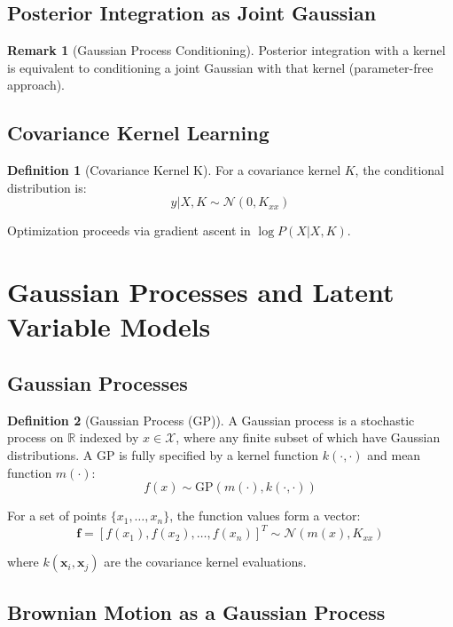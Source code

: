 \documentclass[12pt,a4paper]{article}
\theoremstyle{definition}
\newtheorem{definition}{Definition}[section]
\newtheorem{remark}{Remark}[section]
\begin{document}
\subsection{Posterior Integration as Joint Gaussian}

\begin{remark}[Gaussian Process Conditioning]
Posterior integration with a kernel is equivalent to conditioning a joint Gaussian with that kernel (parameter-free approach).
\end{remark}

\subsection{Covariance Kernel Learning}

\begin{definition}[Covariance Kernel K]
For a covariance kernel $K$, the conditional distribution is:
\[
y | X, K \sim \mathcal{N}(0, K_{xx})
\]

Optimization proceeds via gradient ascent in $\log P(X | X, K)$.
\end{definition}

\newpage

\section{Gaussian Processes and Latent Variable Models}

\subsection{Gaussian Processes}

\begin{definition}[Gaussian Process (GP)]
A Gaussian process is a stochastic process on $\mathbb{R}$ indexed by $x \in \mathcal{X}$, where any finite subset of which have Gaussian distributions. A GP is fully specified by a kernel function $k(\cdot, \cdot)$ and mean function $m(\cdot)$:
\[
f(x) \sim \text{GP}(m(\cdot), k(\cdot, \cdot))
\]

For a set of points $\{x_1, \ldots, x_n\}$, the function values form a vector:
\[
\mathbf{f} = [f(x_1), f(x_2), \ldots, f(x_n)]^T \sim \mathcal{N}(m(x), K_{xx})
\]

where $k(\mathbf{x}_i, \mathbf{x}_j)$ are the covariance kernel evaluations.
\end{definition}

\subsection{Brownian Motion as a Gaussian Process}
\end{document}
